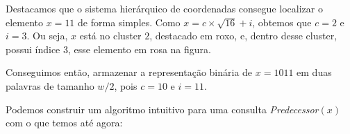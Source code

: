 Destacamos que o sistema hierárquico de coordenadas consegue localizar o
elemento $x=11$ de forma simples. Como $x=c\times \sqrt{16} + i$, obtemos que
$c=2$ e $i=3$. Ou seja, $x$ está no cluster $2$, destacado em roxo, e, dentro
desse cluster, possui índice $3$, esse elemento em rosa na figura. 

Conseguimos então, armazenar a representação binária de $x=1011$ em duas
palavras de tamanho $w/2$, pois $c=10$ e $i=11$.

%
%
%
%
%
%    
%
%
%

Podemos construir um algoritmo intuitivo para uma consulta
\textit{Predecessor}$(x)$ com o que temos até agora:

